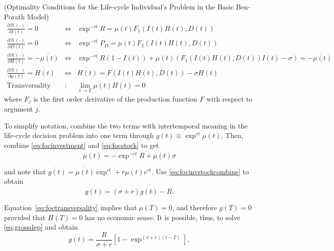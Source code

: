 \begin{condition} (Optimality Conditions for the Life-cycle Individual's Problem in the Basic Ben-Porath Model) 
\begin{eqnarray}
\frac{\partial \mathcal{H} (\cdot)}{\partial I(t)} = 0 &\Leftrightarrow& \exp^{-rt}R = \mu(t) F_{1} \left( I(t) H(t), D(t) \right) \label{eq:focinvestment} \\
\frac{\partial \mathcal{H} (\cdot)}{\partial D(t)} = 0 &\Leftrightarrow& \exp^{-rt}P_D = \mu(t) F_{2} \left( I(t) H(t), D(t) \right) \label{eq:focgoods} \\
\frac{\partial \mathcal{H} (\cdot)}{\partial H(t)} = - \dot{\mu(t)} &\Leftrightarrow& \exp^{-rt} R \left( 1 - I (t) \right) + \mu(t) \left(  F_{1} \left( I(t) H(t), D(t) \right)I(t) - \sigma \right) = - \dot{\mu(t)} \label{eq:focstock} \\ 
\frac{\partial \mathcal{H} (\cdot)}{\partial \mu(t)} = \dot{H(t)} &\Leftrightarrow& \dot{H(t)} = F \left( I(t) H(t), D(t) \right) - \sigma H(t) \label{eq:focmotion} \\
\text{Transversality} &:& \lim_{t \rightarrow T} \mu(t) H(t) = 0 \label{eq:foctransversality}
\end{eqnarray}
where $F_j$ is the first order derivative of the production function $F$ with respect to argument $j$.
\end{condition}

\indent To simplify notation, combine the two terms with intertemporal meaning in the life-cycle decision problem into one term through $g(t)\equiv \exp^{rt}\mu(t)$. Then, combine \eqref{eq:focinvestment} and \eqref{eq:focstock} to get 
\begin{equation}
\dot{\mu(t)} = - \exp^{-rt} R + \mu(t) \sigma \label{eq:focinvstockcombine}
\end{equation}

\noindent and note that $\dot{g(t)} = \dot{\mu(t)} \exp^{rt} + r \mu(t) e ^{rt}$. Use \eqref{eq:focinvstockcombine} to obtain 
\begin{equation}
\dot{g(t)} = (\sigma + r ) g(t) - R. \label{eq:grossdep}
\end{equation}

\indent Equation~\eqref{eq:foctransversality} implies that $\mu(T) = 0 $, and therefore $g(T) = 0$ provided that $H(T) = 0$ has no economic sense.%
 It is possible, thus, to solve \eqref{eq:grossdep} and obtain
\begin{equation}
g(t) = \frac{R}{\sigma + r} \left[ 1 - \exp^{(\sigma + r)(t - T)} \right],
\end{equation}

